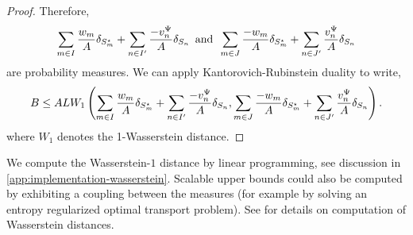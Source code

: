 \begin{proof}
Therefore, 
\begin{align}
    \sum_{m \in I} \frac{w_m}{A} \delta_{S^{\star}_m}  + \sum_{n \in I'} \frac{-v_n^{\Psi}}{A} \delta_{S_n} \text{\, and \,} \sum_{m \in J} \frac{-w_m}{A} \delta_{S^{\star}_m}  + \sum_{n \in J'} \frac{v_n^{\Psi}}{A} \delta_{S_n}
\end{align}
are probability measures. We can apply Kantorovich-Rubinstein duality to write,
\begin{align}
    B \leq AL W_1\left(\sum_{m \in I} \frac{w_m}{A} \delta_{S^{\star}_m}  + \sum_{n \in I'} \frac{-v_n^{\Psi}}{A} \delta_{S_n} , \sum_{m \in J} \frac{-w_m}{A} \delta_{S^{\star}_m}  + \sum_{n \in J'} \frac{v_n^{\Psi}}{A} \delta_{S_n}\right).
\end{align}
where $W_1$ denotes the 1-Wasserstein distance. 
\end{proof}

We compute the Wasserstein-$1$ distance by linear programming, see discussion in \cref{app:implementation-wasserstein}. Scalable upper bounds could also be computed by exhibiting a coupling between the measures (for example by solving an entropy regularized optimal transport problem). See \citep[Chapters 3 and 4]{peyre_computational_2019} for details on computation of Wasserstein distances.

